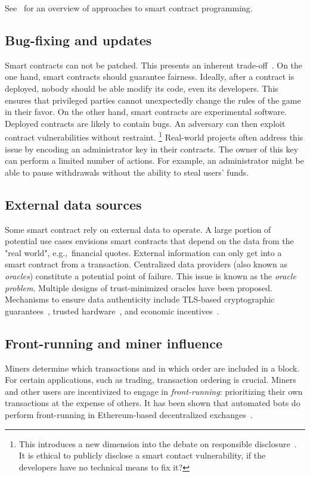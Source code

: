 See~\cite{Seijas2016} for an overview of approaches to smart contract programming.

\subsection{Bug-fixing and updates}
Smart contracts can not be patched.
This presents an inherent trade-off~\cite{Porru2017}.
On the one hand, smart contracts should guarantee fairness.
Ideally, after a contract is deployed, nobody should be able modify its code, even its developers.
This ensures that privileged parties cannot unexpectedly change the rules of the game in their favor.
On the other hand, smart contracts are experimental software.
Deployed contracts are likely to contain bugs.
An adversary can then exploit contract vulnerabilities without restraint.
\footnote{This introduces a new dimension into the debate on responsible disclosure~\cite{Schneier2007}. It is ethical to publicly disclose a smart contact vulnerability, if the developers have no technical means to fix it?}
Real-world projects often address this issue by encoding an administrator key in their contracts.
The owner of this key can perform a limited number of actions.
For example, an administrator might be able to pause withdrawals without the ability to steal users' funds.

\subsection{External data sources}
Some smart contract rely on external data to operate.
A large portion of potential use cases envisions smart contracts that depend on the data from the "real world", e.g.,~financial quotes.
External information can only get into a smart contract from a transaction.
Centralized data providers (also known as \textit{oracles}) constitute a potential point of failure.
This issue is known as the \textit{oracle problem}.
Multiple designs of trust-minimized oracles have been proposed.
Mechanisms to ensure data authenticity include TLS-based cryptographic guarantees~\cite{Provable}, trusted hardware~\cite{Zhang2016}, and economic incentives~\cite{Chainlink}.

\subsection{Front-running and miner influence}
Miners determine which transactions and in which order are included in a block.
For certain applications, such as trading, transaction ordering is crucial.
Miners and other users are incentivized to engage in \textit{front-running}: prioritizing their own transactions at the expense of others.
It has been shown that automated bots do perform front-running in Ethereum-based decentralized exchanges~\cite{Daian2019}.

